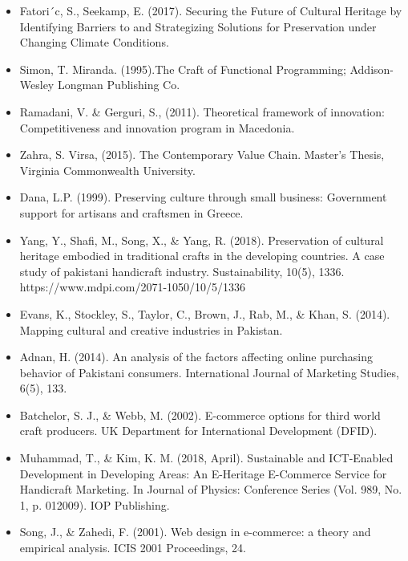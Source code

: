 \begin{itemize}
\item Fatori´c, S., Seekamp, E. (2017). Securing the Future of Cultural Heritage by Identifying Barriers to and Strategizing Solutions for Preservation under Changing Climate Conditions. 

\item Simon, T. Miranda. (1995).The Craft of Functional Programming; Addison-Wesley Longman Publishing Co.

\item Ramadani, V. \& Gerguri, S., (2011).  Theoretical framework of innovation: Competitiveness and innovation program in Macedonia.

\item Zahra, S. Virsa, (2015). The Contemporary Value Chain. Master’s Thesis, Virginia Commonwealth University.

\item Dana, L.P. (1999). Preserving culture through small business: Government support for artisans and craftsmen in Greece. 

\item Yang, Y., Shafi, M., Song, X., \& Yang, R. (2018). Preservation of cultural heritage embodied in traditional crafts in the developing countries. A case study of pakistani handicraft industry. Sustainability, 10(5), 1336. https://www.mdpi.com/2071-1050/10/5/1336

\item Evans, K., Stockley, S., Taylor, C., Brown, J., Rab, M., \& Khan, S. (2014). Mapping cultural and creative industries in Pakistan. 

\item Adnan, H. (2014). An analysis of the factors affecting online purchasing behavior of Pakistani consumers. International Journal of Marketing Studies, 6(5), 133.

\item Batchelor, S. J., \& Webb, M. (2002). E-commerce options for third world craft producers. UK Department for International Development (DFID).

\item Muhammad, T., \& Kim, K. M. (2018, April). Sustainable and ICT-Enabled Development in Developing Areas: An E-Heritage E-Commerce Service for Handicraft Marketing. In Journal of Physics: Conference Series (Vol. 989, No. 1, p. 012009). IOP Publishing.

\item Song, J., \& Zahedi, F. (2001). Web design in e-commerce: a theory and empirical analysis. ICIS 2001 Proceedings, 24.


\end{itemize}
